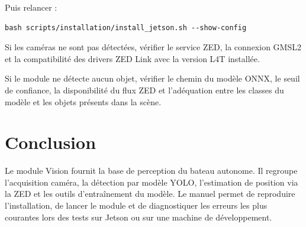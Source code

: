 \documentclass[11pt,letterpaper]{article}
\begin{document}
Puis relancer :

\begin{verbatim}
bash scripts/installation/install_jetson.sh --show-config
\end{verbatim}

Si les caméras ne sont pas détectées, vérifier le service ZED, la connexion GMSL2 et la compatibilité des drivers ZED Link avec la version L4T installée.

Si le module ne détecte aucun objet, vérifier le chemin du modèle ONNX, le seuil de confiance, la disponibilité du flux ZED et l’adéquation entre les classes du modèle et les objets présents dans la scène.

\section{Conclusion}

Le module Vision fournit la base de perception du bateau autonome. Il regroupe l’acquisition caméra, la détection par modèle YOLO, l’estimation de position via la ZED et les outils d’entraînement du modèle. Le manuel permet de reproduire l’installation, de lancer le module et de diagnostiquer les erreurs les plus courantes lors des tests sur Jetson ou sur une machine de développement.
\end{document}

